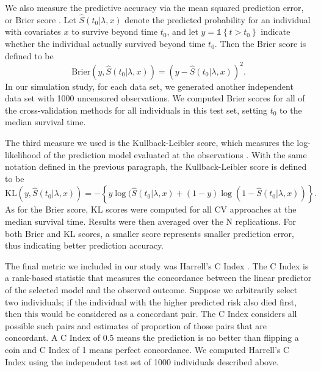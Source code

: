 \par We also measure the predictive accuracy via the mean squared prediction error, or Brier score \citep{VanHouwelingen2011}. Let $\hat{S}(t_0|\lambda,x)$ denote the predicted probability for an individual with covariates $x$ to survive beyond time $t_0$, and let $y = \mathbb{1}\left\{ t > t_{0}\right\}$ indicate whether the individual actually survived beyond time $t_0$. Then the Brier score is defined to be
\begin{equation}
\text{Brier}(y, \hat{S}(t_0|\lambda,x)) = (y - \hat{S}(t_0|\lambda,x))^2.
\end{equation}
In our simulation study, for each data set, we generated another independent data set with 1000 uncensored observations. We computed Brier scores for all of the cross-validation methods for all individuals in this test set, setting $t_0$ to the median survival time.

\par The third measure we used is the Kullback-Leibler score, which measures the log-likelihood of the prediction model evaluated at the observations \citep{VanHouwelingen2011}. With the same notation defined in the previous paragraph, the Kullback-Leibler score is defined to be
\begin{equation}
	\text{KL}(y, \hat{S}(t_0|\lambda,x)) = -\left\{ y\log(\hat{S}(t_0|\lambda,x) + (1 - y)\log(1 - \hat{S}(t_0|\lambda,x)) \right\}.
\end{equation}
As for the Brier score, KL scores were computed for all CV approaches at the median survival time.  Results were then averaged over the N replications. For both Brier and KL scores, a smaller score represents smaller prediction error, thus indicating better prediction accuracy.

\par The final metric we included in our study was Harrell's C Index \citep{HarrellJr1984}. The C Index is a rank-based statistic that measures the concordance between the linear predictor of the selected model and the observed outcome. Suppose we arbitrarily select two individuals; if the individual with the higher predicted risk also died first, then this would be considered as a concordant pair. The C Index considers all possible such pairs and estimates of proportion of those pairs that are concordant. A C Index of 0.5 means the prediction is no better than flipping a coin and C Index of 1 means perfect concordance. We computed Harrell's C Index using the independent test set of 1000 individuals described above.

